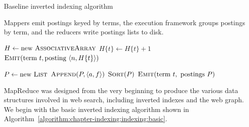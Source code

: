 \begin{algorithm}[t]
\caption{Baseline inverted indexing algorithm}
\label{algorithm:chapter-indexing:indexing:basic}
Mappers emit postings keyed by terms, the execution framework groups
postings by term, and the reducers write postings lists to disk.

\algrenewcommand{}
  \begin{algorithmic}[1]
    \State $H \gets \textrm{new }\textsc{AssociativeArray}$
    \State $H\{t\} \gets H\{t\} + 1$
    \EndFor
    \State $\textsc{Emit}(\textrm{term }t, \textrm{posting }\langle n, H\{t\} \rangle )$
    \EndFor
    \EndProcedure
    \EndFunction
  \end{algorithmic}

  \begin{algorithmic}[1]
    \State $P \gets \textrm{new }\textsc{List}$
    \State $\textsc{Append}(P, \langle a, f \rangle )$
    \EndFor
    \State $\textsc{Sort}(P)$
    \State $\textsc{Emit}(\textrm{term }t, \textrm{ postings } P)$
    \EndProcedure
    \EndFunction
  \end{algorithmic}
\end{algorithm}

MapReduce was designed from the very beginning to produce the various
data structures involved in web search, including inverted indexes and
the web graph.  We begin with the basic inverted indexing algorithm 
shown in Algorithm~\ref{algorithm:chapter-indexing:indexing:basic}.

